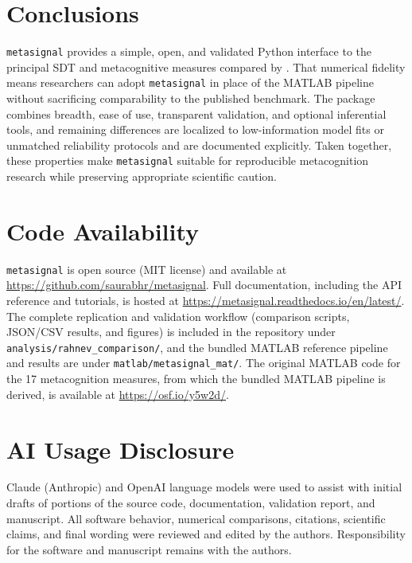 \documentclass{article}
\begin{document}
\section{Conclusions}\label{conclusions}

\texttt{metasignal} provides a simple, open, and validated Python interface to the principal SDT and metacognitive measures compared by \citet{rahnev2025}. That numerical fidelity means researchers can adopt \texttt{metasignal} in place of the MATLAB pipeline without sacrificing comparability to the published benchmark. The package combines breadth, ease of use, transparent validation, and optional inferential tools, and remaining differences are localized to low-information model fits or unmatched reliability protocols and are documented explicitly. Taken together, these properties make \texttt{metasignal} suitable for reproducible metacognition research while preserving appropriate scientific caution.

\section*{Code Availability}

\texttt{metasignal} is open source (MIT license) and available at \url{https://github.com/saurabhr/metasignal}. Full documentation, including the API reference and tutorials, is hosted at \url{https://metasignal.readthedocs.io/en/latest/}. The complete \citet{rahnev2025} replication and validation workflow (comparison scripts, JSON/CSV results, and figures) is included in the repository under \texttt{analysis/rahnev\_comparison/}, and the bundled MATLAB reference pipeline and results are under \texttt{matlab/metasignal\_mat/}. The original MATLAB code for the 17 metacognition measures, from which the bundled MATLAB pipeline is derived, is available at \url{https://osf.io/y5w2d/}\citep{rahnev2025}.

\section*{AI Usage Disclosure}

Claude (Anthropic) and OpenAI language models were used to assist with initial drafts of portions of the source code, documentation, validation report, and manuscript. All software behavior, numerical comparisons, citations, scientific claims, and final wording were reviewed and edited by the authors. Responsibility for the software and manuscript remains with the authors.




\end{document}
